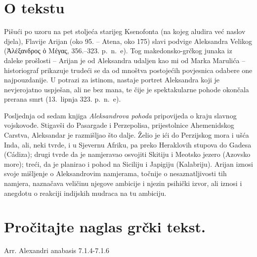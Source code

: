 


\section*{O tekstu}

Pišući po uzoru na pet stoljeća starijeg Ksenofonta (na kojeg aludira već naslov djela), Flavije Arijan (oko 95. – Atena, oko 175) slavi podvige Aleksandra Velikog \textgreek[variant=ancient]{(Ἀλέξανδρος ὁ Μέγας,} 356.–323. p.~n.~e). Tog makedonsko-grčkog junaka iz daleke prošlosti – Arijan je od Aleksandra udaljen kao mi od Marka Marulića – historiograf prikazuje trudeći se da od mnoštva postojećih povjesnica odabere one najpouzdanije. U potrazi za istinom, nastaje portret Aleksandra koji je nevjerojatno uspješan, ali ne bez mana, te čije je spektakularne pohode okončala prerana smrt (13.\ lipnja 323. p.~n.~e).

Posljednja od sedam knjiga \textit{Aleksandrova pohoda}  pripovijeda o kraju slavnog vojskovođe. Stigavši do Pasargade i Perzepolisa, prijestolnice Ahemenidskog Carstva, Aleksandar je razmišljao što dalje. Želio je ići do Perzijskog mora i ušća Inda, ali, neki tvrde, i u Sjevernu Afriku, pa preko Heraklovih stupova do Gadesa (Cádiza); drugi tvrde da je namjeravao osvojiti Skitiju i Meotsko jezero (Azovsko more); treći, da je planirao i pohod na Siciliju i Japigiju (Kalabriju). Arijan iznosi svoje mišljenje o Aleksandrovim namjerama, točnije o nesaznatljivosti tih namjera, naznačava veličinu njegove ambicije i njezin psihički izvor, ali iznosi i anegdotu o reakciji indijskih mudraca na tu ambiciju.

\newpage

\section*{Pročitajte naglas grčki tekst.}

Arr. Alexandri anabasis 7.1.4-7.1.6


\medskip


